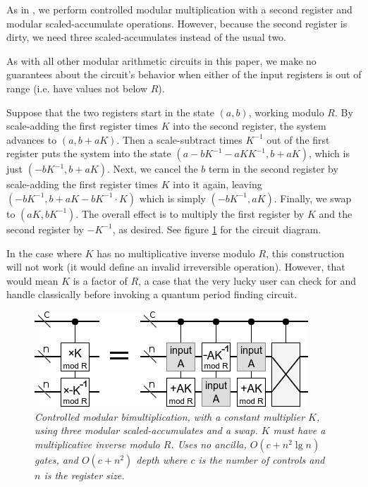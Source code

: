 \documentclass[twocolumn]{article}
\begin{document}
As in \cite{beauregard2003}, we perform controlled modular multiplication with a second register and modular scaled-accumulate operations.
However, because the second register is dirty, we need three scaled-accumulates instead of the usual two.

As with all other modular arithmetic circuits in this paper, we make no guarantees about the circuit's behavior when either of the input registers is out of range (i.e. have values not below $R$).

Suppose that the two registers start in the state $(a, b)$, working modulo $R$.
By scale-adding the first register times $K$ into the second register, the system advances to $(a, b+aK)$.
Then a scale-subtract times $K^{-1}$ out of the first register puts the system into the state $(a-bK^{-1}-aKK^{-1}, b+aK)$, which is just $(-bK^{-1}, b+aK)$.
Next, we cancel the $b$ term in the second register by scale-adding the first register times $K$ into it again, leaving $(-bK^{-1}, b+aK-bK^{-1} \cdot K)$ which is simply $(-bK^{-1}, aK)$.
Finally, we swap to $(aK, bK^{-1})$.
The overall effect is to multiply the first register by $K$ and the second register by $-K^{-1}$, as desired.
See figure \ref{fig:controlled-modular-multiply} for the circuit diagram.

In the case where $K$ has no multiplicative inverse modulo $R$, this construction will not work (it would define an invalid irreversible operation).
However, that would mean $K$ is a factor of $R$, a case that the very lucky user can check for and handle classically before invoking a quantum period finding circuit.

\begin{figure}
  \centering
  \includegraphics[width=\linewidth]{assets/controlled-modular-multiply.png}
  \caption{\em
    Controlled modular bimultiplication, with a constant multiplier $K$, using three modular scaled-accumulates and a swap.
    $K$ must have a multiplicative inverse modulo $R$.
    Uses no ancilla, $O(c + n^2 \lg n)$ gates, and $O(c + n^2)$ depth where $c$ is the number of controls and $n$ is the register size.
  }
  \label{fig:controlled-modular-multiply}
\end{figure}
\end{document}
